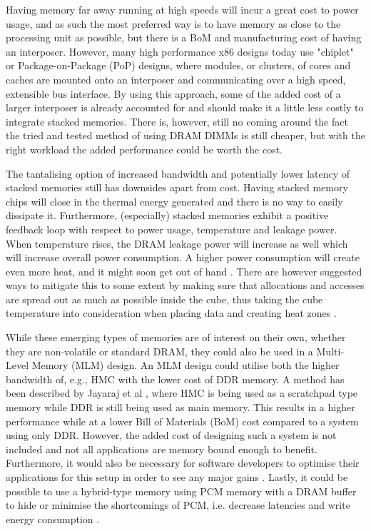 Having memory far away running at high speeds will incur a great cost to power usage, and as such the most preferred way is to have memory as close to the processing unit as possible, but there is a BoM and manufacturing cost of having an interposer. However, many high performance x86 designs today use "chiplet" or Package-on-Package (PoP) designs, where modules, or clusters, of cores and caches are mounted onto an interposer and communicating over a high speed, extensible bus interface. By using this approach, some of the added cost of a larger interposer is already accounted for and should make it a little less costly to integrate stacked memories. There is, however, still no coming around the fact the tried and tested method of using DRAM DIMMs is still cheaper, but with the right workload the added performance could be worth the cost.
\bigskip

The tantalising option of increased bandwidth and potentially lower latency of stacked memories still has downsides apart from cost. Having stacked memory chips will close in the thermal energy generated and there is no way to easily dissipate it. Furthermore, (especially) stacked memories exhibit a positive feedback loop with respect to power usage, temperature and leakage power. When temperature rises, the DRAM leakage power will increase as well which will increase overall power consumption. A higher power consumption will create even more heat, and it might soon get out of hand \cite{4212027}. There are however suggested ways to mitigate this to some extent by making sure that allocations and accesses are spread out as much as possible inside the cube, thus taking the cube temperature into consideration when placing data and creating heat zones \cite{7252085}.
\bigskip

While these emerging types of memories are of interest on their own, whether they are non-volatile or standard DRAM, they could also be used in a Multi-Level Memory (MLM) design. An MLM design could utilise both the higher bandwidth of, e.g., HMC with the lower cost of DDR memory. A method has been described by Jayaraj et al \cite{Jayaraj:2015:PPM:2818950.2818976}, where HMC is being used as a scratchpad type memory while DDR is still being used as main memory. This results in a higher performance while at a lower Bill of Materials (BoM) cost compared to a system using only DDR. However, the added cost of designing such a system is not included and not all applications are memory bound enough to benefit. Furthermore, it would also be necessary for software developers to optimise their applications for this setup in order to see any major gains \cite{Bender:2015:KCT:2818950.2818977, BENDER2017213}. Lastly, it could be possible to use a hybrid-type memory using PCM memory with a DRAM buffer to hide or minimise the shortcomings of PCM, i.e. decrease latencies and write energy consumption \cite{Lee:2009:APC:1555815.1555758}.
\bigskip

